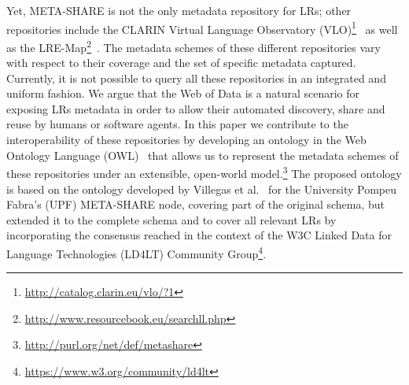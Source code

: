 \documentclass{llncs}
\begin{document}
Yet, META-SHARE is not the only metadata repository for LRs;
other repositories include the CLARIN Virtual Language Observatory
(VLO)\footnote{\url{http://catalog.clarin.eu/vlo/?1}}~\cite{broeder2010data} as
well as the LRE-Map\footnote{\url{http://www.resourcebook.eu/searchll.php}}~\cite{calzolari2012lre}.
The metadata schemes of these different repositories vary with respect to their coverage and the set of specific metadata captured.
Currently, it is not possible to query all these repositories in an integrated and uniform fashion.
We argue that the Web of Data is a natural scenario for exposing LRs metadata in order to allow their automated discovery, share and reuse by humans or software agents. %
In this paper we contribute to the interoperability of these repositories by
developing an ontology in the Web Ontology Language (OWL)~\cite{motik2012owl}
that allows us to represent the metadata schemes of these repositories under an
extensible, open-world model.\footnote{\url{http://purl.org/net/def/metashare}}
The proposed ontology is based on the ontology developed by Villegas et
al.~\cite{Villegas2014} for the University Pompeu Fabra's (UPF) META-SHARE node, covering part of the original schema, but extended it to the complete schema and to cover all relevant LRs by incorporating the consensus
reached in the context of the W3C Linked Data for Language Technologies (LD4LT) Community Group\footnote{\url{https://www.w3.org/community/ld4lt}}.
\end{document}
